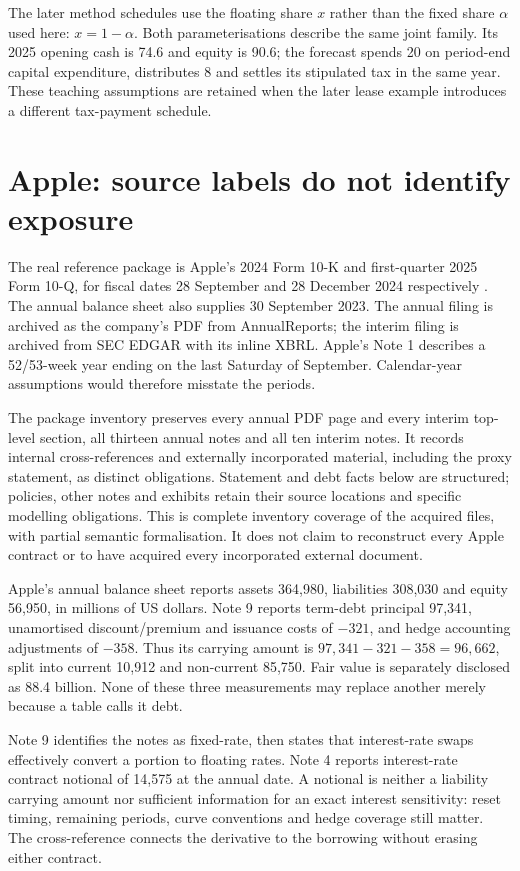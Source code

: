 The later method schedules use the floating share $x$ rather than the fixed
share $\alpha$ used here: $x=1-\alpha$. Both parameterisations describe the
same joint family. Its 2025 opening cash is 74.6 and equity is 90.6; the
forecast spends 20 on period-end capital expenditure, distributes 8 and settles
its stipulated tax in the same year. These teaching assumptions are retained
when the later lease example introduces a different tax-payment schedule.

\section{Apple: source labels do not identify exposure}
\label{sec:apple}

The real reference package is Apple's 2024 Form 10-K and first-quarter 2025
Form 10-Q, for fiscal dates 28 September and 28 December 2024 respectively
\citep{apple2024,apple2025q1}. The annual balance sheet also supplies
30 September 2023. The annual filing is archived as the company's PDF from
AnnualReports; the interim filing is archived from SEC EDGAR with its inline
XBRL. Apple's Note 1 describes a 52/53-week year ending on the last Saturday
of September. Calendar-year assumptions would therefore misstate the periods.

The package inventory preserves every annual PDF page and every interim
top-level section, all thirteen annual notes and all ten interim notes.
It records internal cross-references and externally incorporated material,
including the proxy statement, as distinct obligations. Statement and debt
facts below are structured; policies, other notes and exhibits retain their
source locations and specific modelling obligations. This is complete
inventory coverage of the acquired files, with partial semantic formalisation.
It does not claim to reconstruct every Apple contract or to have acquired
every incorporated external document.

Apple's annual balance sheet reports assets 364,980, liabilities 308,030 and
equity 56,950, in millions of US dollars. Note 9 reports term-debt principal
97,341, unamortised discount/premium and issuance costs of $-321$, and hedge
accounting adjustments of $-358$. Thus its carrying amount is
$97{,}341-321-358=96{,}662$, split into current 10,912 and non-current
85,750. Fair value is separately disclosed as 88.4 billion. None of these
three measurements may replace another merely because a table calls it debt.

Note 9 identifies the notes as fixed-rate, then states that interest-rate
swaps effectively convert a portion to floating rates. Note 4 reports
interest-rate contract notional of 14,575 at the annual date. A notional is
neither a liability carrying amount nor sufficient information for an exact
interest sensitivity: reset timing, remaining periods, curve conventions and
hedge coverage still matter. The cross-reference connects the derivative to
the borrowing without erasing either contract.

